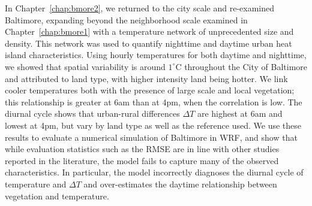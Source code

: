 In Chapter~\ref{chap:bmore2}, we returned to the city scale and re-examined Baltimore, expanding beyond the neighborhood scale examined in Chapter~\ref{chap:bmore1} with a temperature network of unprecedented size and density. This network was used to
quantify nighttime and daytime urban heat island characteristics. Using hourly temperatures for both daytime and nighttime, we showed that 
spatial variability is around $1^\circ$C throughout the City of Baltimore and attributed to land type, with higher intensity land being hotter. 
We link cooler temperatures both with the presence of large scale and local vegetation; this relationship is greater at 6am than at 4pm, when the correlation is low. The diurnal cycle shows that urban-rural differences $\Delta T$ are highest at 6am and lowest at 4pm, but vary by land type as well as the reference used. We use these results to evaluate a numerical simulation of Baltimore in WRF, and show that while evaluation statistics such as the RMSE are in line with other studies reported in the literature, the model fails to capture many of the observed characteristics. In particular, the model incorrectly diagnoses the diurnal cycle of temperature and $\Delta T$ and over-estimates the daytime relationship between vegetation and temperature. 

